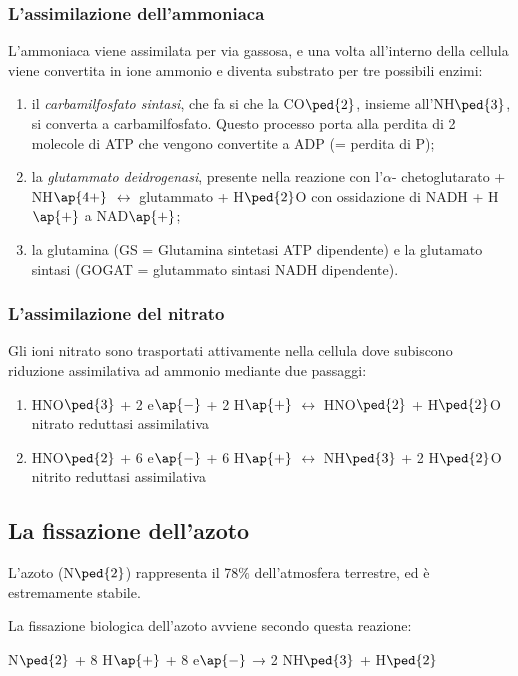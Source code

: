 \documentclass[11pt]{book}
\begin{document}
\subsubsection{L'assimilazione dell'ammoniaca} 
L’ammoniaca viene assimilata per via gassosa, e una volta all’interno della cellula viene convertita in ione ammonio e diventa substrato per tre possibili enzimi:
\begin{enumerate}
\item il \emph{carbamilfosfato sintasi}, che fa si che la CO$\ped{2}$, insieme all'NH$\ped{3}$, si converta a carbamilfosfato. Questo processo porta alla perdita di 2 molecole di ATP che vengono convertite a ADP (= perdita di P); 
\item la \emph{glutammato deidrogenasi}, presente nella reazione con l'$\alpha$- chetoglutarato + NH$\ap{4+}$ $\longleftrightarrow$ glutammato + H$\ped{2}$O con ossidazione di NADH + H$\ap{+}$ a NAD$\ap{+}$;
\item la glutamina (GS = Glutamina sintetasi ATP dipendente) e la glutamato sintasi (GOGAT = glutammato sintasi NADH dipendente).
\end{enumerate}

\subsubsection{L'assimilazione del nitrato}
Gli ioni nitrato sono trasportati attivamente nella cellula dove subiscono riduzione assimilativa ad ammonio mediante due passaggi:
\begin{enumerate}
\item HNO$\ped{3}$ + 2 e$\ap{-}$ + 2 H$\ap{+}$ $\longleftrightarrow$ HNO$\ped{2}$ + H$\ped{2}$O nitrato reduttasi assimilativa 
\item HNO$\ped{2}$ + 6 e$\ap{-}$ + 6 H$\ap{+}$ $\longleftrightarrow$ NH$\ped{3}$ + 2 H$\ped{2}$O nitrito reduttasi assimilativa
\end{enumerate}

\subsection{La fissazione dell’azoto} 
L'azoto (N$\ped{2}$) rappresenta il 78$\%$ dell'atmosfera terrestre, ed è estremamente stabile.

\vspace{1em}
La fissazione biologica dell'azoto avviene secondo questa reazione:

N$\ped{2}$ + 8 H$\ap{+}$ + 8 e$\ap{-}$ → 2 NH$\ped{3}$ + H$\ped{2}$ 
\end{document}
